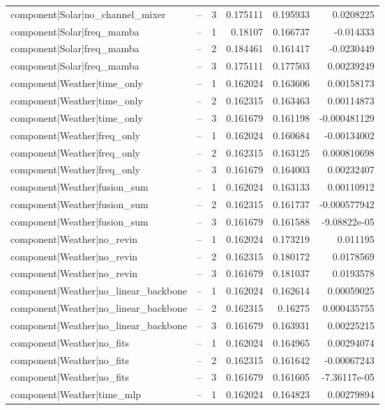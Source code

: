 \begin{longtable}{llrrrr}
component|Solar|no\_channel\_mixer & -- & 3 & 0.175111 & 0.195933 & 0.0208225 \\
component|Solar|freq\_mamba & -- & 1 & 0.18107 & 0.166737 & -0.014333 \\
component|Solar|freq\_mamba & -- & 2 & 0.184461 & 0.161417 & -0.0230449 \\
component|Solar|freq\_mamba & -- & 3 & 0.175111 & 0.177503 & 0.00239249 \\
component|Weather|time\_only & -- & 1 & 0.162024 & 0.163606 & 0.00158173 \\
component|Weather|time\_only & -- & 2 & 0.162315 & 0.163463 & 0.00114873 \\
component|Weather|time\_only & -- & 3 & 0.161679 & 0.161198 & -0.000481129 \\
component|Weather|freq\_only & -- & 1 & 0.162024 & 0.160684 & -0.00134002 \\
component|Weather|freq\_only & -- & 2 & 0.162315 & 0.163125 & 0.000810698 \\
component|Weather|freq\_only & -- & 3 & 0.161679 & 0.164003 & 0.00232407 \\
component|Weather|fusion\_sum & -- & 1 & 0.162024 & 0.163133 & 0.00110912 \\
component|Weather|fusion\_sum & -- & 2 & 0.162315 & 0.161737 & -0.000577942 \\
component|Weather|fusion\_sum & -- & 3 & 0.161679 & 0.161588 & -9.08822e-05 \\
component|Weather|no\_revin & -- & 1 & 0.162024 & 0.173219 & 0.011195 \\
component|Weather|no\_revin & -- & 2 & 0.162315 & 0.180172 & 0.0178569 \\
component|Weather|no\_revin & -- & 3 & 0.161679 & 0.181037 & 0.0193578 \\
component|Weather|no\_linear\_backbone & -- & 1 & 0.162024 & 0.162614 & 0.00059025 \\
component|Weather|no\_linear\_backbone & -- & 2 & 0.162315 & 0.16275 & 0.000435755 \\
component|Weather|no\_linear\_backbone & -- & 3 & 0.161679 & 0.163931 & 0.00225215 \\
component|Weather|no\_fits & -- & 1 & 0.162024 & 0.164965 & 0.00294074 \\
component|Weather|no\_fits & -- & 2 & 0.162315 & 0.161642 & -0.00067243 \\
component|Weather|no\_fits & -- & 3 & 0.161679 & 0.161605 & -7.36117e-05 \\
component|Weather|time\_mlp & -- & 1 & 0.162024 & 0.164823 & 0.00279894 \\

\end{longtable}
